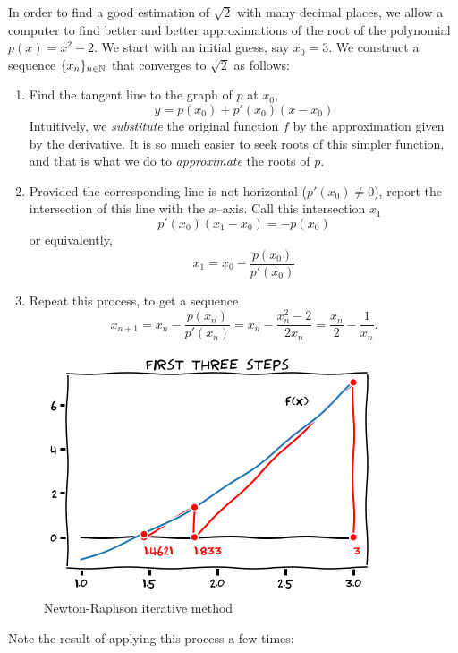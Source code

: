 In order to find a good estimation of $\sqrt{2}$ with many decimal places, we allow a computer to find better and better approximations of the root  of the polynomial $p(x)=x^2-2$.  We start with an initial guess, say $x_0=3$.  We construct a sequence $\{ x_n \}_{n\in\mathbb{N}}$ that converges to $\sqrt{2}$ as follows:
\begin{enumerate}
\item Find the tangent line to the graph of $p$ at $x_0$, 
\begin{equation*}
y = p(x_0) + p'(x_0)(x-x_0)
\end{equation*}
Intuitively, we \emph{substitute} the original function $f$ by the approximation given by the derivative.  It is so much easier to seek roots of this simpler function, and that is what we do to \emph{approximate} the roots of $p$.
\item Provided the corresponding line is not horizontal ($p'(x_0)\neq 0$), report the intersection of this line with the $x$--axis.  Call this intersection $x_1$
\begin{equation*}
p'(x_0) (x_1 - x_0) = -p(x_0)
\end{equation*}
or equivalently,
\begin{equation*}
x_1=x_0-\frac{p(x_0)}{p'(x_0)}
\end{equation*}
\item Repeat this process, to get a sequence 
\begin{equation*}
x_{n+1} = x_n - \frac{p(x_n)}{p'(x_n)} = x_n - \frac{x_n^2-2}{2x_n}=\frac{x_n}{2}-\frac{1}{x_n}.
\end{equation*}
\end{enumerate}
\begin{figure}[ht!]
\includegraphics[width=0.6\linewidth]{images/newton1.png}
\caption{Newton-Raphson iterative method}
\label{figure:Newton-Raphson}
\end{figure}
Note the result of applying this process a few times:
